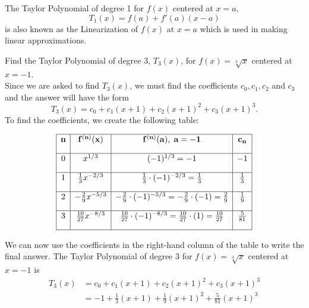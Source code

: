 \documentclass[handout]{ximera}
\begin{document}
\begin{remark}
The Taylor Polynomial of degree 1 for $f(x)$ centered at $x = a$,
\[
T_1(x) = f(a) + f'(a)(x-a)
\]
is also known as the Linearization of $f(x)$ at $x = a$ which is used in making linear approximations.
\end{remark}


\begin{example}[example 2] Find the Taylor Polynomial of degree 3, $T_3(x)$, for $f(x) = \sqrt[3] x$ centered at $x = -1$.\\
Since we are asked to find $T_3(x)$, we must find the coefficients $c _0, c_1, c_2$ and $c_3$
and the answer will have the form 
\[
T_3(x) = c_0 + c_1(x+1) + c_2(x+1)^2 + c_3(x+1)^3.
\]
To find the coefficients, we create the following table:

\[
\begin{array}{|c|c|c|c|} 
\hline
\bf{n} & \bf{f^{(n)}(x)} & \bf{f^{(n)}(a), \; a = -1} & \bf{c_n} \\[1em] 
\hline
 0 & x^{1/3} & (-1)^{1/3} = -1 & -1 \\[1em]
\hline
1 & \frac13 x^{-2/3} & \frac13 \cdot (-1)^{-2/3} = \frac13 & \frac13 \\[1em]
\hline
 2 & -\frac29 x^{-5/3} & -\frac29 \cdot (-1)^{-5/3} 
= -\frac29 \cdot (-1) = \frac29 & \frac{1}{9} \\[1em]
\hline
 3 & \frac{10}{27} x^{-8/3} & \frac{10}{27} \cdot (-1)^{-8/3} = \frac{10}{27} \cdot (1) = \frac{10}{27} & \frac{5}{81}\\[1em]
\hline
\end{array}
\]



We can now use the coefficients in the right-hand column of the table to write the final answer. 
The Taylor Polynomial of degree 3 for $f(x) = \sqrt[3] x$ centered at $x = -1$ is
\begin{align*}
T_3(x) &= c_0 + c_1(x+1) + c_2(x+1)^2 + c_3(x+1)^3  \\
        &= -1 + \frac13(x+1) + \frac{1}{9}(x+1)^2 + \frac{5}{81}(x+1)^3 
\end{align*}

\end{example}
\end{document}
